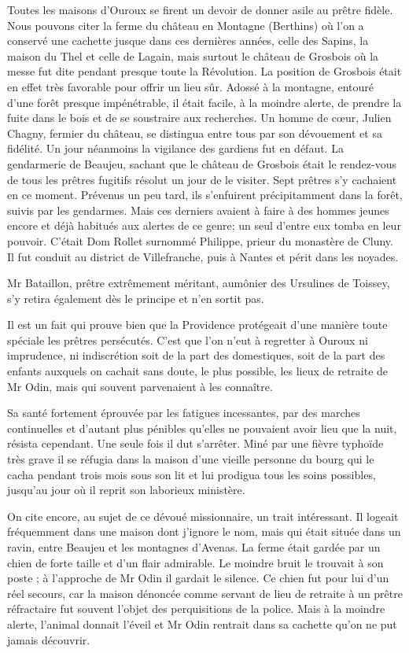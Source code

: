 Toutes les maisons d'Ouroux se firent un devoir de donner asile au prêtre fidèle. Nous pouvons citer la ferme du château en Montagne (Berthins) où l'on a conservé une cachette jusque dans ces dernières années, celle des Sapins, la maison du Thel et celle de Lagain, mais surtout le château de Grosbois où la messe fut dite pendant presque toute la Révolution. La position de Grosbois était en effet très favorable pour offrir un lieu sûr. Adossé à la montagne, entouré d'une forêt presque impénétrable, il était facile, à la moindre alerte, de prendre la fuite dans le bois et de se soustraire aux recherches. Un homme de cœur, Julien Chagny, fermier du château, se distingua entre tous par son dévouement et sa fidélité. Un jour néanmoins la vigilance des gardiens fut en défaut. La gendarmerie de Beaujeu, sachant que le château de Grosbois était le rendez-vous de tous les prêtres fugitifs résolut un jour de le visiter. Sept prêtres s'y cachaient en ce moment. Prévenus un peu tard, ils s'enfuirent précipitamment dans la forêt, suivis par les gendarmes. Mais ces derniers avaient à faire à des hommes jeunes encore et déjà habitués aux alertes de ce genre; un seul d'entre eux tomba en leur pouvoir. C'était Dom Rollet surnommé Philippe, prieur du monastère de Cluny. Il fut conduit au district de Villefranche, puis à Nantes et périt dans les noyades.

Mr Bataillon, prêtre extrêmement méritant, aumônier des Ursulines de Toissey, s'y retira également dès le principe et n'en sortit pas.

Il est un fait qui prouve bien que la Providence protégeait d'une manière toute spéciale les prêtres persécutés. C'est que l'on n'eut à regretter à Ouroux ni imprudence, ni indiscrétion soit de la part des domestiques, soit de la part des enfants auxquels on cachait sans doute, le plus possible, les lieux de retraite de Mr Odin, mais qui souvent parvenaient à les connaître.

Sa santé fortement éprouvée par les fatigues incessantes, par des marches continuelles et d'autant plus pénibles qu'elles ne pouvaient
avoir lieu que la nuit, résista cependant. Une seule fois il dut s'arrêter. Miné par une fièvre typhoïde très grave il se réfugia dans la maison d'une vieille personne du bourg qui le cacha pendant trois mois sous son lit et lui prodigua tous les soins possibles, jusqu'au jour où il reprit son laborieux ministère.

On cite encore, au sujet de ce dévoué missionnaire, un trait intéressant. Il logeait fréquemment dans une maison dont j'ignore le nom, mais qui était située dans un ravin, entre Beaujeu et les montagnes d'Avenas. La ferme était gardée par un chien de forte taille et d'un flair admirable. Le moindre bruit le trouvait à son poste ; à l'approche de Mr Odin il gardait le silence. Ce chien fut pour lui d'un réel secours, car la maison dénoncée comme servant de lieu de retraite à un prêtre réfractaire fut souvent l'objet des perquisitions de la police. Mais à la moindre alerte, l'animal donnait l'éveil et Mr Odin rentrait dans sa cachette qu'on ne put jamais découvrir.

